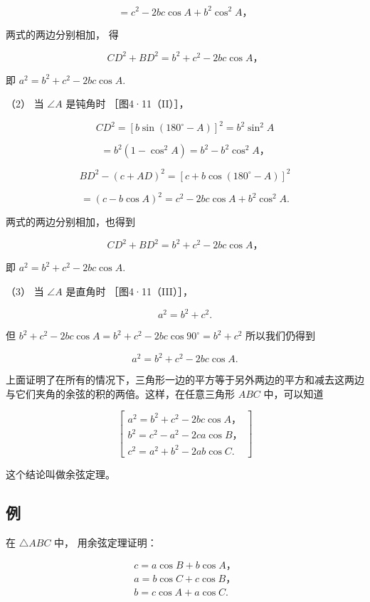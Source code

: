 \[
= c ^ {2} - 2 b c \cos A + b ^ {2} \cos^ {2} A\text{，}
\]

两式的两边分别相加， 得

\[
C D ^ {2} + B D ^ {2} = b ^ {2} + c ^ {2} - 2 b c \cos A\text{，}
\]

即 \(a^2 = b^2 + c^2 - 2bc\cos A.\)

（2） 当 \(\angle A\) 是钝角时 ［图4·11（II）］，

\[
C D ^ {2} = [ b \sin (180 ^{\circ} - A) ] ^ {2} = b ^ {2} \sin^ {2} A
\]

\[
= b ^ {2} (1 - \cos^ {2} A) = b ^ {2} - b ^ {2} \cos^ {2} A\text{，}
\]

\[
B D ^ {2} - (c + A D) ^ {2} = [ c + b \cos (180 ^{\circ} - A) ] ^ {2}
\]

\[
= (c - b \cos A) ^ {2} = c ^ {2} - 2 b c \cos A + b ^ {2} \cos^ {2} A.
\]

两式的两边分别相加，也得到

\[
C D ^ {2} + B D ^ {2} = b ^ {2} + c ^ {2} - 2 b c \cos A\text{，}
\]

即 \(a^2 = b^2 + c^2 - 2bc\cos A.\)

（3） 当 \(\angle A\) 是直角时 ［图4·11（III）］，

\[
a ^ {2} = b ^ {2} + c ^ {2}.
\]

但
\(b^{2} + c^{2} - 2bc\cos A = b^{2} + c^{2} - 2bc\cos 90^{\circ} = b^{2} + c^{2}\)
所以我们仍得到

\[
a ^ {2} = b ^ {2} + c ^ {2} - 2 b c \cos A.
\]

上面证明了在所有的情况下，三角形一边的平方等于另外两边的平方和减去这两边与它们夹角的余弦的积的两倍。这样，在任意三角形
\(ABC\) 中，可以知道

\[
\left[ \begin{array}{l} a ^ {2} = b ^ {2} + c ^ {2} - 2 b c \cos A\text{，} \\ b ^ {2} = c ^ {2} - a ^ {2} - 2 c a \cos B\text{，} \\ c ^ {2} = a ^ {2} + b ^ {2} - 2 a b \cos C. \end{array} \right]
\]

这个结论叫做余弦定理。

\subsection{例}

在 \(\triangle ABC\) 中， 用余弦定理证明：

\[
\begin{array}{l} c = a \cos B + b \cos A\text{，} \\ a = b \cos C + c \cos B\text{，} \\ b = c \cos A + a \cos C. \\ \end{array}
\]

